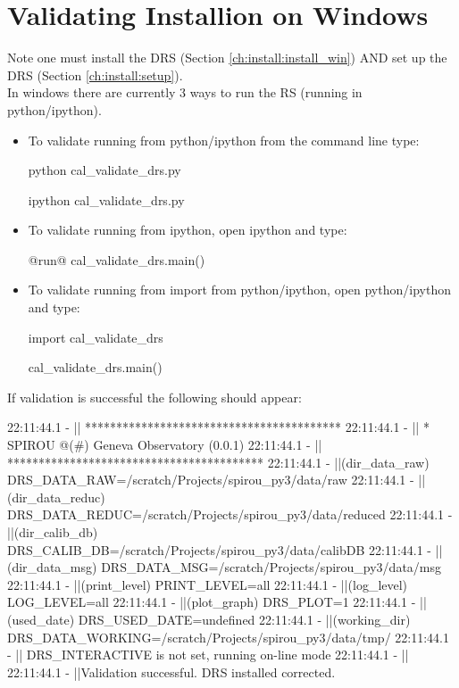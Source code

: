 \clearpage
\newpage
\section{Validating Installion on Windows}
\label{ch:install:validating_installwin}

Note one must install the DRS (Section \ref{ch:install:install_win}) AND set up the DRS (Section \ref{ch:install:setup}). \\

In windows there are currently 3 ways to run the RS (running in python/ipython).

\begin{itemize}

\item To validate running from python/ipython from the command line type:
\begin{cmdbox}
python cal_validate_drs.py

ipython cal_validate_drs.py
\end{cmdbox}

\item To validate running from ipython, open ipython and type:
\begin{pythonbox}
@run@ cal_validate_drs.main()
\end{pythonbox}

\item To validate running from import from python/ipython, open python/ipython and type:
\begin{pythonbox}
import cal_validate_drs

cal_validate_drs.main()
\end{pythonbox}

\end{itemize}

\noindent If validation is successful the following should appear:

\begin{cmdbox}
22:11:44.1 -   || *****************************************
22:11:44.1 -   || * SPIROU @(#) Geneva Observatory (0.0.1)
22:11:44.1 -   || *****************************************
22:11:44.1 -   ||(dir_data_raw)      DRS_DATA_RAW=/scratch/Projects/spirou_py3/data/raw
22:11:44.1 -   ||(dir_data_reduc)    DRS_DATA_REDUC=/scratch/Projects/spirou_py3/data/reduced
22:11:44.1 -   ||(dir_calib_db)      DRS_CALIB_DB=/scratch/Projects/spirou_py3/data/calibDB
22:11:44.1 -   ||(dir_data_msg)      DRS_DATA_MSG=/scratch/Projects/spirou_py3/data/msg
22:11:44.1 -   ||(print_level)       PRINT_LEVEL=all         %
22:11:44.1 -   ||(log_level)         LOG_LEVEL=all         %
22:11:44.1 -   ||(plot_graph)        DRS_PLOT=1            %
22:11:44.1 -   ||(used_date)         DRS_USED_DATE=undefined
22:11:44.1 -   ||(working_dir)       DRS_DATA_WORKING=/scratch/Projects/spirou_py3/data/tmp/
22:11:44.1 -   ||                    DRS_INTERACTIVE is not set, running on-line mode
22:11:44.1 -   ||
22:11:44.1 -   ||Validation successful. DRS installed corrected.
\end{cmdbox}